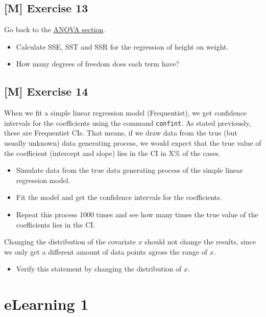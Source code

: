 \documentclass[
]{book}
\providecommand{\tightlist}{%
  \setlength{\itemsep}{0pt}\setlength{\parskip}{0pt}}
\begin{document}
\subsection{{[}M{]} Exercise 13}\label{exercise13_simpl_lin_reg}

Go back to the \hyperref[analysis_of_variance]{ANOVA section}.

\begin{itemize}
\item
  Calculate SSE, SST and SSR for the regression of height on weight.
\item
  How many degrees of freedom does each term have?
\end{itemize}

\subsection{{[}M{]} Exercise 14}\label{exercise14_simpl_lin_reg}

When we fit a simple linear regression model (Frequentist), we get confidence intervals for the coefficients
using the command \texttt{confint}. As stated previously, these are Frequentist CIs. That means,
if we draw data from the true (but usually unknown) data generating process, we would expect
that the true value of the coefficient (intercept and slope) lies in the CI in X\% of the cases.

\begin{itemize}
\tightlist
\item
  Simulate data from the true data generating process of the simple linear regression model.
\item
  Fit the model and get the confidence intervals for the coefficients.
\item
  Repeat this process 1000 times and see how many times the true value of the coefficients
  lies in the CI.
\end{itemize}

Changing the distribution of the covariate \(x\) should not change the results, since
we only get a different amount of data points agross the range of \(x\).

\begin{itemize}
\tightlist
\item
  Verify this statement by changing the distribution of \(x\).
\end{itemize}

\section{eLearning 1}\label{elearning-1}
\end{document}
